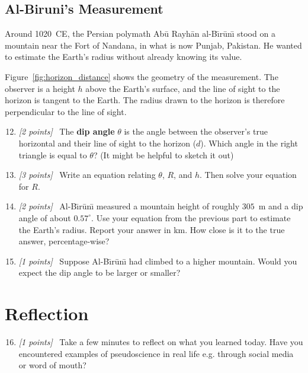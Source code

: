 \documentclass[11pt]{article}
\newcommand{\pts}[1]{\textit{[#1 points]}\ }
\begin{document}
\subsection{Al-Biruni's Measurement}

Around 1020~CE, the Persian polymath Ab\=u Rayh\=an al-B\={\i}r\=un\={\i}
stood on a mountain near the Fort of Nandana, in what is now Punjab,
Pakistan. He wanted to estimate the Earth's radius without already knowing
its value.

Figure~\ref{fig:horizon_distance} shows the geometry of the measurement.
The observer is a height $h$ above the Earth's surface, and the line of
sight to the horizon is tangent to the Earth. The radius drawn to the
horizon is therefore perpendicular to the line of sight.

\begin{enumerate}
    \setcounter{enumi}{11}

      \item \pts{2} The \textbf{dip angle} $\theta$ is the angle between the
    observer's true horizontal and their line of sight to the horizon ($d$). Which angle in the right
    triangle is equal to $\theta$? (It might be helpful to sketch it out)

    \item \pts{3} Write an equation
    relating $\theta$, $R$, and $h$. Then solve your equation
    for $R$.

    \item \pts{2} Al-B\={\i}r\=un\={\i} measured a mountain height of roughly
    $305$~m and a dip angle of about $0.57^\circ$. Use your equation from
    the previous part to estimate the Earth's radius. Report your answer
    in km. How close is it to the true answer, percentage-wise?

    \item \pts{1} Suppose Al-B\={\i}r\=un\={\i} had climbed to a higher
    mountain. Would you expect the dip angle to be larger or smaller?
\end{enumerate}



\section{Reflection}
\begin{enumerate}
    \setcounter{enumi}{15}
    \item \pts{1} Take a few minutes to reflect on what you learned today. Have you encountered examples of pseudoscience in real life e.g. through social media or word of mouth? 
\end{enumerate}
\end{document}
